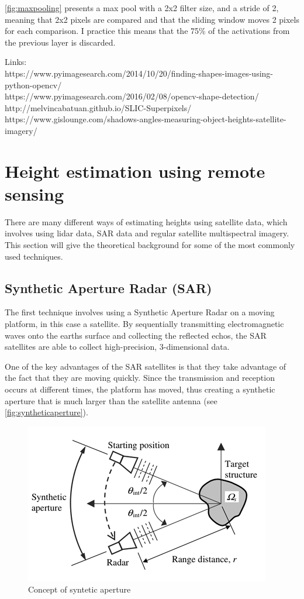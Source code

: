 \autoref{fig:maxpooling} presents a max pool with a 2x2 filter size, and a stride of 2, meaning that 2x2 pixels are compared and that the sliding window moves 2 pixels for each comparison. I practice this means that the 75\% of the activations from the previous layer is discarded.

Links:\\
https://www.pyimagesearch.com/2014/10/20/finding-shapes-images-using-python-opencv/\\
https://www.pyimagesearch.com/2016/02/08/opencv-shape-detection/
\\
http://melvincabatuan.github.io/SLIC-Superpixels/
\\
https://www.gislounge.com/shadows-angles-measuring-object-heights-satellite-imagery/
\\

\section{Height estimation using remote sensing}\label{section:theoreticheight}

There are many different ways of estimating heights using satellite data, which involves using lidar data, SAR data and regular satellite multispectral imagery. This section will give the theoretical background for some of the most commonly used techniques.

\subsection{Synthetic Aperture Radar (SAR)}
The first technique involves using a Synthetic Aperture Radar on a moving platform, in this case a satellite. By sequentially transmitting electromagnetic waves onto the earths surface and collecting the reflected echos, the SAR satellites are able to collect high-precision, 3-dimensional data.

One of the key advantages of the SAR satellites is that they take advantage of the fact that they are moving quickly. Since the transmission and reception occurs at different times, the platform has moved, thus creating a synthetic aperture that is much larger than the satellite antenna (see \autoref{fig:syntheticaperture}).

\begin{figure}[!h]
	\centering
	\includegraphics[scale=0.7]{fig/sar.jpg}
	\caption{Concept of syntetic aperture \cite{Yu2012}}
	\label{fig:syntheticaperture}
\end{figure}

